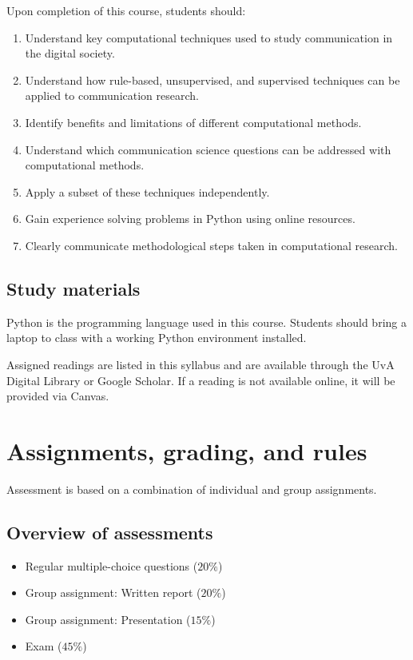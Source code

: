 \documentclass[a4paper,10pt]{report}
\begin{document}
Upon completion of this course, students should:

\begin{enumerate}[label=\alph*)]
\item Understand key computational techniques used to study communication in the digital society.
\item Understand how rule-based, unsupervised, and supervised techniques can be applied to communication research.
\item Identify benefits and limitations of different computational methods.
\item Understand which communication science questions can be addressed with computational methods.
\item Apply a subset of these techniques independently.
\item Gain experience solving problems in Python using online resources.
\item Clearly communicate methodological steps taken in computational research.
\end{enumerate}

\section{Study materials}

Python is the programming language used in this course. Students should bring a laptop to class with a working Python environment installed.

Assigned readings are listed in this syllabus and are available through the UvA Digital Library or Google Scholar. If a reading is not available online, it will be provided via Canvas.

\chapter{Assignments, grading, and rules}

Assessment is based on a combination of individual and group assignments.

\section{Overview of assessments}

\begin{itemize}
\item Regular multiple-choice questions (\(20\%\))
\item Group assignment: Written report (\(20\%\))
\item Group assignment: Presentation (\(15\%\))
\item Exam (\(45\%\))
\end{itemize}
\end{document}
